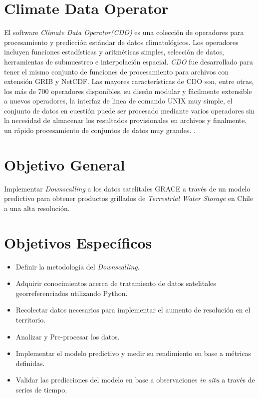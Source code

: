 \section{Climate Data Operator}
El software \textit{Climate Data Operator(CDO)} es una colección de operadores para procesamiento y predicción estándar de datos climatológicos.
Los operadores incluyen funciones estadísticas y aritméticas simples, selección de datos, herramientas de submuestreo e interpolación espacial.
\textit{CDO} fue desarrollado para tener el mismo conjunto de funciones de procesamiento para archivos con extensión GRIB y NetCDF. Las mayores características
de CDO son, entre otras, los más de 700 operadores disponibles, su diseño modular y fácilmente extensible a nuevos operadores, la interfaz de linea de comando UNIX muy simple,
el conjunto de datos en cuestión puede ser procesado mediante varios operadores sin la necesidad de almacenar los resultados provisionales en archivos y finalmente, un rápido procesamiento
de conjuntos de datos muy grandes. \cite{16}.
%
%
%
%
\section{Objetivo General}

Implementar \textit{Downscalling} a los datos satelitales GRACE a través de un modelo predictivo para obtener 
productos grillados de \textit{Terrestrial Water Storage} en Chile a una alta resolución.
%
%
%
%
\section{Objetivos Específicos}
\begin{itemize}
    \item Definir la metodología del \textit{Downscalling}.
    \item Adquirir conocimientos acerca de tratamiento de datos satelitales georreferenciados utilizando Python.
    \item Recolectar datos necesarios para implementar el aumento de resolución en el territorio.
    \item Analizar y Pre-procesar los datos. 
    \item Implementar el modelo predictivo y medir su rendimiento en base a métricas definidas.
    \item Validar las predicciones del modelo en base a observaciones \textit{in situ} a través de series de tiempo.
\end{itemize}